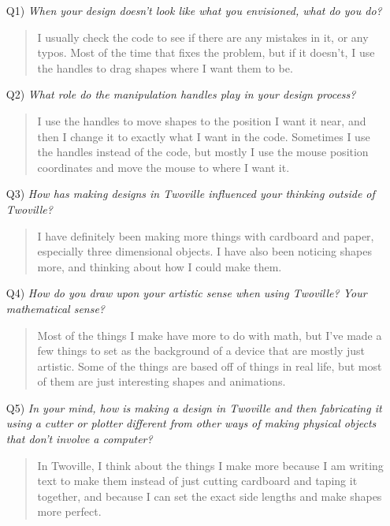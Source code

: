 \begin{itemize}
\item[Q1)] {\em When your design doesn't look like what you envisioned, what do you do?}
\begin{quote}
I usually check the code to see if there are any mistakes in it, or any typos. Most of the time that fixes the problem, but if it doesn't, I use the handles to drag shapes where I want them to be.
\end{quote}
\item[Q2)] {\em What role do the manipulation handles play in your design process?}
\begin{quote}
I use the handles to move shapes to the position I want it near, and then I change it to exactly what I want in the code. Sometimes I use the handles instead of the code, but mostly I use the mouse position coordinates and move the mouse to where I want it.
\end{quote}
\item[Q3)] {\em How has making designs in Twoville influenced your thinking outside of Twoville?}
\begin{quote}
I have definitely been making more things with cardboard and paper, especially three dimensional objects. I have also been noticing shapes more, and thinking about how I could make them.
\end{quote}
\item[Q4)] {\em How do you draw upon your artistic sense when using Twoville? Your mathematical sense?}
\begin{quote}
Most of the things I make have more to do with math, but I've made a few things to set as the background of a device that are mostly just artistic. Some of the things are based off of things in real life, but most of them are just interesting shapes and animations.
\end{quote}
\item[Q5)] {\em In your mind, how is making a design in Twoville and then fabricating it using a cutter or plotter different from other ways of making physical objects that don’t involve a computer?}
\begin{quote}
In Twoville, I think about the things I make more because I am writing text to make them instead of just cutting cardboard and taping it together, and because I can set the exact side lengths and make shapes more perfect.
\end{quote}
\end{itemize}
